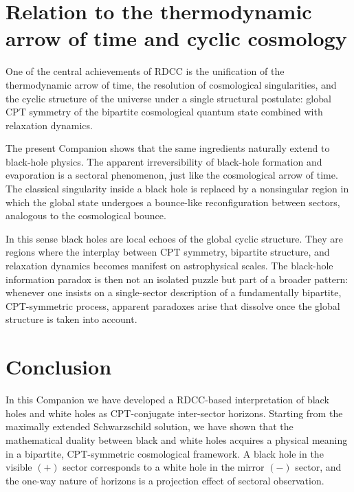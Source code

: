 \documentclass[11pt,a4paper]{article}
\begin{document}
\section{Relation to the thermodynamic arrow of time and cyclic cosmology}

One of the central achievements of RDCC is the unification of the thermodynamic arrow of time, 
the resolution of cosmological singularities, and the cyclic structure of the universe under a 
single structural postulate: global CPT symmetry of the bipartite cosmological quantum state 
combined with relaxation dynamics.

The present Companion shows that the same ingredients naturally extend to black-hole physics. 
The apparent irreversibility of black-hole formation and evaporation is a sectoral phenomenon, 
just like the cosmological arrow of time. The classical singularity inside a black hole is replaced 
by a nonsingular region in which the global state undergoes a bounce-like reconfiguration 
between sectors, analogous to the cosmological bounce.

In this sense black holes are local echoes of the global cyclic structure. They are regions where 
the interplay between CPT symmetry, bipartite structure, and relaxation dynamics becomes 
manifest on astrophysical scales. The black-hole information paradox is then not an isolated 
puzzle but part of a broader pattern: whenever one insists on a single-sector description of a 
fundamentally bipartite, CPT-symmetric process, apparent paradoxes arise that dissolve once 
the global structure is taken into account.


\section{Conclusion}

In this Companion we have developed a RDCC-based interpretation of black holes and white holes 
as CPT-conjugate inter-sector horizons. Starting from the maximally extended Schwarzschild 
solution, we have shown that the mathematical duality between black and white holes acquires 
a physical meaning in a bipartite, CPT-symmetric cosmological framework. A black hole in the 
visible \((+)\) sector corresponds to a white hole in the mirror \((-)\) sector, and the one-way 
nature of horizons is a projection effect of sectoral observation.
\end{document}

